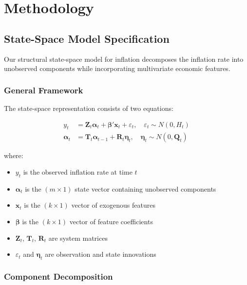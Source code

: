 \section{Methodology}

\subsection{State-Space Model Specification}

Our structural state-space model for inflation decomposes the inflation rate into unobserved components while incorporating multivariate economic features.

\subsubsection{General Framework}

The state-space representation consists of two equations:

\begin{align}
y_t &= \mathbf{Z}_t \boldsymbol{\alpha}_t + \boldsymbol{\beta}' \mathbf{x}_t + \varepsilon_t, \quad \varepsilon_t \sim N(0, H_t) \label{eq:obs}\\
\boldsymbol{\alpha}_t &= \mathbf{T}_t \boldsymbol{\alpha}_{t-1} + \mathbf{R}_t \boldsymbol{\eta}_t, \quad \boldsymbol{\eta}_t \sim N(0, \mathbf{Q}_t) \label{eq:state}
\end{align}

where:
\begin{itemize}
    \item $y_t$ is the observed inflation rate at time $t$
    \item $\boldsymbol{\alpha}_t$ is the $(m \times 1)$ state vector containing unobserved components
    \item $\mathbf{x}_t$ is the $(k \times 1)$ vector of exogenous features
    \item $\boldsymbol{\beta}$ is the $(k \times 1)$ vector of feature coefficients
    \item $\mathbf{Z}_t$, $\mathbf{T}_t$, $\mathbf{R}_t$ are system matrices
    \item $\varepsilon_t$ and $\boldsymbol{\eta}_t$ are observation and state innovations
\end{itemize}

\subsubsection{Component Decomposition}


